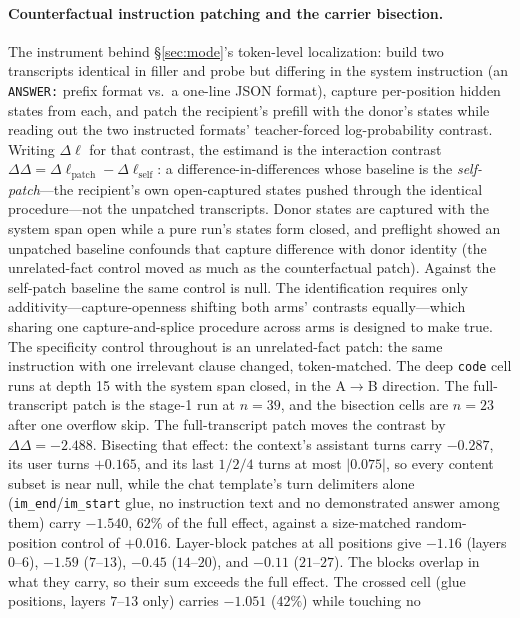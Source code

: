 \documentclass{article}
\begin{document}
\paragraph{Counterfactual instruction patching and the carrier bisection.}
The instrument behind \S\ref{sec:mode}'s token-level localization: build two transcripts
identical in filler and probe but differing in the system instruction (an \texttt{ANSWER:}
prefix format vs.\ a one-line JSON format), capture per-position hidden states from each, and
patch the recipient's prefill with the donor's states while reading out the two instructed
formats' teacher-forced log-probability contrast. Writing $\Delta\ell$ for that contrast, the
estimand is the interaction contrast
$\Delta\Delta = \Delta\ell_{\mathrm{patch}} - \Delta\ell_{\mathrm{self}}$: a
difference-in-differences whose baseline is the \emph{self-patch}---the recipient's own
open-captured states pushed through the identical procedure---not the unpatched transcripts.
Donor states are captured with the system span open while a pure run's
states form closed, and preflight showed an unpatched baseline confounds that capture
difference with donor identity (the unrelated-fact control moved as much as the
counterfactual patch). Against the self-patch baseline the same control is null. The
identification requires only additivity---capture-openness shifting both arms' contrasts
equally---which sharing one capture-and-splice procedure across arms is designed to make
true. The
specificity control throughout is an unrelated-fact patch: the same instruction with one
irrelevant clause changed, token-matched. The deep \texttt{code} cell runs at depth 15 with
the system span closed, in the A$\to$B direction. The full-transcript patch is the stage-1
run at $n{=}39$, and the bisection cells are $n{=}23$ after one overflow skip. The
full-transcript patch moves
the contrast by $\Delta\Delta = -2.488$. Bisecting that effect: the context's assistant turns
carry $-0.287$, its user turns $+0.165$, and its last $1/2/4$ turns at most $|0.075|$, so every
content subset is near null, while the chat template's turn delimiters alone
(\texttt{im\_end}/\texttt{im\_start} glue, no instruction text and no demonstrated answer
among them) carry $\mathbf{-1.540}$, $62\%$ of the full effect, against a size-matched
random-position control of $+0.016$. Layer-block patches at all positions give $-1.16$
(layers $0$--$6$), $-1.59$ ($7$--$13$), $-0.45$ ($14$--$20$), and $-0.11$ ($21$--$27$). The
blocks overlap in what they carry, so their sum exceeds the full effect. The crossed
cell (glue positions, layers $7$--$13$ only) carries $-1.051$ ($42\%$) while touching no
\end{document}
